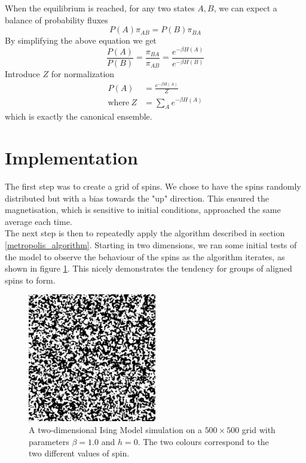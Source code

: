 \documentclass[11pt]{article}
\begin{document}
	When the equilibrium is reached, for any two states $A, B$, we can expect a balance of probability fluxes
	\begin{equation}
		P(A) \pi_{AB} = P(B) \pi_{BA}
	\end{equation}
	By simplifying the above equation we get
	\begin{equation}
		\frac{P(A)}{P(B)} = \frac{\pi_{BA}}{\pi_{AB}} = \frac{e^{-\beta H(A)}}{e^{-\beta H(B)}}
	\end{equation}
	Introduce $Z$ for normalization
	\begin{equation}
		\begin{aligned}
			P(A) &= \frac{e^{-\beta H(A)}}{Z} \\
			\text{where}\ Z &= \sum_A e^{-\beta H(A)}
		\end{aligned}
	\end{equation}
	which is exactly the canonical ensemble.

	\section{Implementation}
	
	The first step was to create a grid of spins. We chose to have the spins randomly distributed but with a bias towards the "up" direction. This ensured the magnetisation, which is sensitive to initial conditions, approached the same average each time.\\
	
	The next step is then to repeatedly apply the algorithm described in section \ref{metropolis_algorithm}. Starting in two dimensions, we ran some initial tests of the model to observe the behaviour of the spins as the algorithm iterates, as shown in figure \ref{fig:ising_grid}. This nicely demonstrates the tendency for groups of aligned spins to form.
	\begin{figure}[H]
		\begin{center}
			\includegraphics[width=0.5\textwidth]{./img/ising-simulation.png}
		\end{center}
		\caption{A two-dimensional Ising Model simulation on a $500\times 500$ grid with parameters $\beta = 1.0$ and $h = 0$. The two colours correspond to the two different values of spin.}
		\label{fig:ising_grid}
	\end{figure}
	
\end{document}
